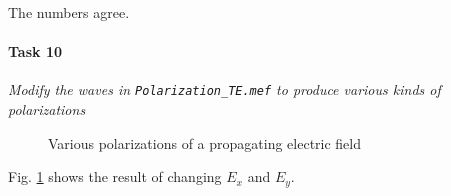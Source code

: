 The numbers agree.

\paragraph{Task 10} \textit{Modify the waves in \texttt{Polarization\_TE.mef} to produce various kinds of polarizations}

\begin{figure}[htpb]
	\centering
	\caption{Various polarizations of a propagating electric field}
	\label{fig:polarization}
\end{figure}

Fig. \ref{fig:polarization} shows the result of changing $E_x$ and $E_y$. 
